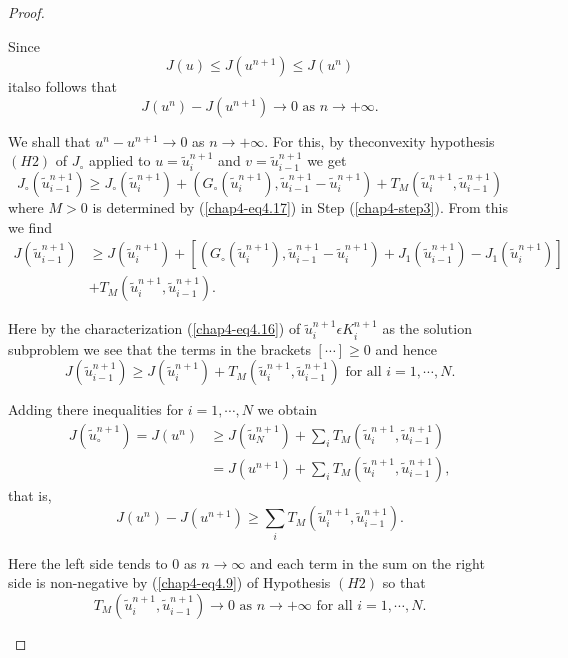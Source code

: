 \begin{proof}
\begin{step}
Since 
$$
J(u) \leq J(u^{n+1}) \leq J(u^{n})
$$
it\pageoriginale also follows that
\begin{equation*}
J(u^{n}) - J(u^{n+1}) \to 0 \text{ as } n \to + \infty.\tag{4.18}\label{chap4-eq4.18}
\end{equation*}
\end{step}

\begin{step}\label{chap4-step4}
 We shall that $u^{n} - u^{n+1} \to 0$ as $n \to + \infty$. For this, by theconvexity hypothesis $(H2)$ of $J_{\circ}$ applied to $u = \widetilde{u}_{i}^{n+1}$ and $v = \widetilde{u}_{i-1}^{n+1}$ we get
$$
J_{\circ}(\widetilde{u}_{i-1}^{n+1}) \geq J_{\circ} (\widetilde{u}_{i}^{n+1}) + (G_{\circ}(\widetilde{u}_{i}^{n+1}), \widetilde{u}_{i-1}^{n+1} - \widetilde{u}_{i}^{n+1}) + T_{M} (\widetilde{u}_{i}^{n+1}, \widetilde{u}_{i-1}^{n+1} )
$$
where $M > 0$ is determined by (\ref{chap4-eq4.17}) in Step (\ref{chap4-step3}). From this we find
\begin{align*}
J(\widetilde{u}_{i-1}^{n+1}) & \geq J(\widetilde{u}_{i}^{n+1}) + [(G_{\circ} (\widetilde{u}_{i}^{n+1}), \widetilde{u}_{i-1}^{n+1} - \widetilde{u}_{i}^{n+1}) + J_{1} (\widetilde{u}_{i-1}^{n+1}) - J_{1} (\widetilde{u}_{i}^{n+1})]\\
& + T_{M} (\widetilde{u}_{i}^{n+1}, \widetilde{u}_{i-1}^{n+1}).
\end{align*}

Here by the characterization (\ref{chap4-eq4.16}) of $\widetilde{u}_{i}^{n+1} \epsilon K_{i}^{n+1}$ as the solution subproblem we see that the terms in the brackets $[ \cdots ] \geq 0$ and hence
$$
J(\widetilde{u}_{i-1}^{n+1}) \geq J(\widetilde{u}_{i}^{n+1}) + T_{M} (\widetilde{u}_{i}^{n+1}, \widetilde{u}_{i-1}^{n+1}) \text{ for all } i = 1, \cdots, N.
$$

Adding there inequalities for $i = 1, \cdots, N$ we obtain
\begin{align*}
J(\widetilde{u}_{\circ}^{n+1}) = J(u^{n}) & \geq J(\widetilde{u}_{N}^{n+1}) + \sum_{i} T_{M} (\widetilde{u}_{i}^{n+1}, \widetilde{u}_{i-1}^{n+1})\\
& = J(u^{n+1}) + \sum_{i} T_{M} (\widetilde{u}_{i}^{n+1}, \widetilde{u}_{i-1}^{n+1}),
\end{align*}
that is,
$$
J(u^{n}) - J(u^{n+1}) \geq \sum_{i} T_{M} (\widetilde{u}_{i}^{n+1}, \widetilde{u}_{i-1}^{n+1}).
$$

Here the left side tends to 0 as $n \to \infty$ and each term in the sum on the right side is non-negative by (\ref{chap4-eq4.9}) of Hypothesis $(H2)$ so that 
$$
T_{M} (\widetilde{u}_{i}^{n+1}, \widetilde{u}_{i-1}^{n+1}) \to 0 \text{ as } n \to + \infty \text{ for all } i = 1, \cdots, N.
$$


\end{step}
\end{proof}
